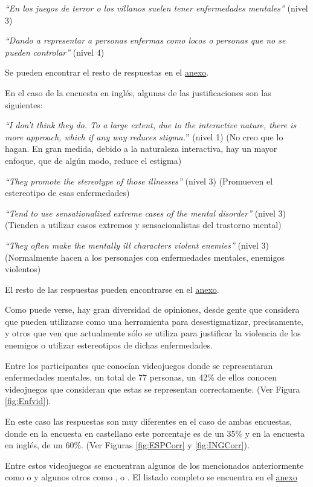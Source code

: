\documentclass[12pt, a4paper,twoside,titlepage]{book}
\begin{document}
\textit{``En los juegos de terror o los villanos suelen tener enfermedades mentales''} (nivel 3)

\textit{``Dando a representar a personas enfermas como locos o personas que no se pueden controlar''} (nivel 4) 

Se pueden encontrar el resto de respuestas en el \hyperref[estigmaCastellano]{anexo}.

En el caso de la encuesta en inglés, algunas de las justificaciones son las siguientes:

\textit{``I don't think they do. To a large extent, due to the interactive nature, there is more approach, which if any way reduces stigma.}'' (nivel 1) (No creo que lo hagan. En gran medida, debido a la naturaleza interactiva, hay un mayor enfoque, que de algún modo, reduce el estigma)  

\textit{``They promote the stereotype of those illnesses''} (nivel 3) (Promueven el estereotipo de esas enfermedades)

\textit{``Tend to use sensationalized extreme cases of the mental disorder''} (nivel 3) (Tienden a utilizar casos extremos y sensacionalistas del trastorno mental)

\textit{``They often make the mentally ill characters violent enemies''} (nivel 3) (Normalmente hacen a los personajes con enfermedades mentales, enemigos violentos)

El resto de las respuestas pueden encontrarse en el \hyperref[estigmaIngles]{anexo}.

Como puede verse, hay gran diversidad de opiniones, desde gente que considera que pueden utilizarse como una herramienta para desestigmatizar, precisamente, y otros que ven que actualmente sólo se utiliza para justificar la violencia de los enemigos o utilizar estereotipos de dichas enfermedades. 

Entre los participantes que conocían videojuegos donde se representaran enfermedades mentales, un total de 77 personas, un 42\% de ellos conocen videojuegos que consideran que estas se representan correctamente. (Ver Figura \ref{fig:Enfvid}). 

En este caso las respuestas son muy diferentes en el caso de ambas encuestas, donde en la encuesta en castellano este porcentaje es de un 35\% y en la encuesta en inglés, de un 60\%. (Ver Figuras \ref{fig:ESPCorr} y \ref{fig:INGCorr}). 

 Entre estos videojuegos se encuentran algunos de los mencionados anteriormente como  o  y algunos otros como ,  o . El listado completo se encuentra en el \hyperref[listadoVidCorr]{anexo}\\ 
 
\end{document}

